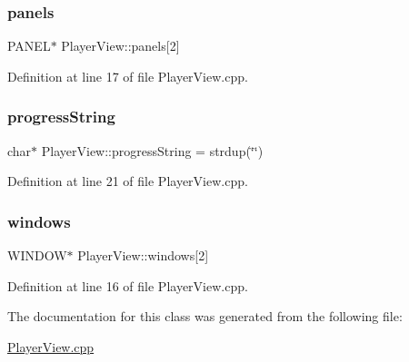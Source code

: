 \mbox{\label{class_player_view_a15c3d2f862dc053fbb377c00e6b00c3a}} 
\subsubsection{\texorpdfstring{panels}{panels}}
{\footnotesize\ttfamily P\+A\+N\+EL$\ast$ Player\+View\+::panels\mbox{[}2\mbox{]}\hspace{0.3cm}{\ttfamily [private]}}



Definition at line 17 of file Player\+View.\+cpp.

\mbox{\label{class_player_view_a40a4eee33d37840c0cc5937f7d583dab}} 
\subsubsection{\texorpdfstring{progress\+String}{progressString}}
{\footnotesize\ttfamily char$\ast$ Player\+View\+::progress\+String = strdup(\char`\"{}\char`\"{})\hspace{0.3cm}{\ttfamily [private]}}



Definition at line 21 of file Player\+View.\+cpp.

\mbox{\label{class_player_view_a79ed8edf0473ff2ae37e82a5c0bbb5d6}} 
\subsubsection{\texorpdfstring{windows}{windows}}
{\footnotesize\ttfamily W\+I\+N\+D\+OW$\ast$ Player\+View\+::windows\mbox{[}2\mbox{]}\hspace{0.3cm}{\ttfamily [private]}}



Definition at line 16 of file Player\+View.\+cpp.



The documentation for this class was generated from the following file\+:\begin{DoxyCompactItemize}
\item 
\mbox{\hyperlink{_player_view_8cpp}{Player\+View.\+cpp}}\end{DoxyCompactItemize}

